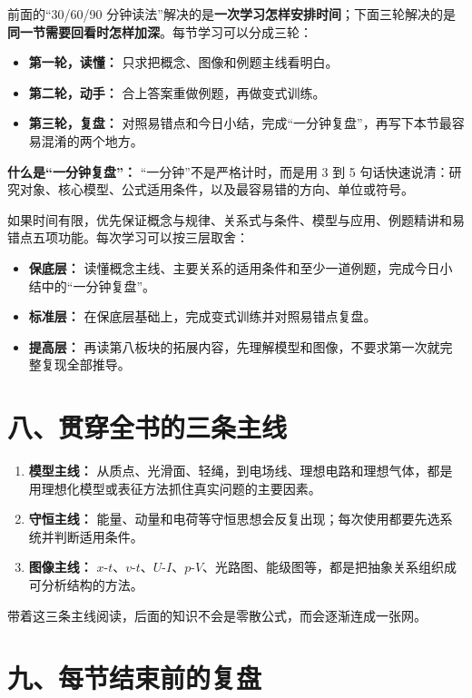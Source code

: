 前面的“30/60/90 分钟读法”解决的是\textbf{一次学习怎样安排时间}；下面三轮解决的是\textbf{同一节需要回看时怎样加深}。每节学习可以分成三轮：

\begin{itemize}
  \item \textbf{第一轮，读懂：} 只求把概念、图像和例题主线看明白。
  \item \textbf{第二轮，动手：} 合上答案重做例题，再做变式训练。
  \item \textbf{第三轮，复盘：} 对照易错点和今日小结，完成“一分钟复盘”，再写下本节最容易混淆的两个地方。
\end{itemize}

\textbf{什么是“一分钟复盘”：} “一分钟”不是严格计时，而是用 3 到 5 句话快速说清：研究对象、核心模型、公式适用条件，以及最容易错的方向、单位或符号。

如果时间有限，优先保证概念与规律、关系式与条件、模型与应用、例题精讲和易错点五项功能。每次学习可以按三层取舍：
\begin{itemize}[nosep]
  \item \textbf{保底层：} 读懂概念主线、主要关系的适用条件和至少一道例题，完成今日小结中的“一分钟复盘”。
  \item \textbf{标准层：} 在保底层基础上，完成变式训练并对照易错点复盘。
  \item \textbf{提高层：} 再读第八板块的拓展内容，先理解模型和图像，不要求第一次就完整复现全部推导。
\end{itemize}

\section*{八、贯穿全书的三条主线}

\begin{enumerate}
  \item \textbf{模型主线：} 从质点、光滑面、轻绳，到电场线、理想电路和理想气体，都是用理想化模型或表征方法抓住真实问题的主要因素。
  \item \textbf{守恒主线：} 能量、动量和电荷等守恒思想会反复出现；每次使用都要先选系统并判断适用条件。
  \item \textbf{图像主线：} $x$-$t$、$v$-$t$、$U$-$I$、$p$-$V$、光路图、能级图等，都是把抽象关系组织成可分析结构的方法。
\end{enumerate}

带着这三条主线阅读，后面的知识不会是零散公式，而会逐渐连成一张网。

\section*{九、每节结束前的复盘}

